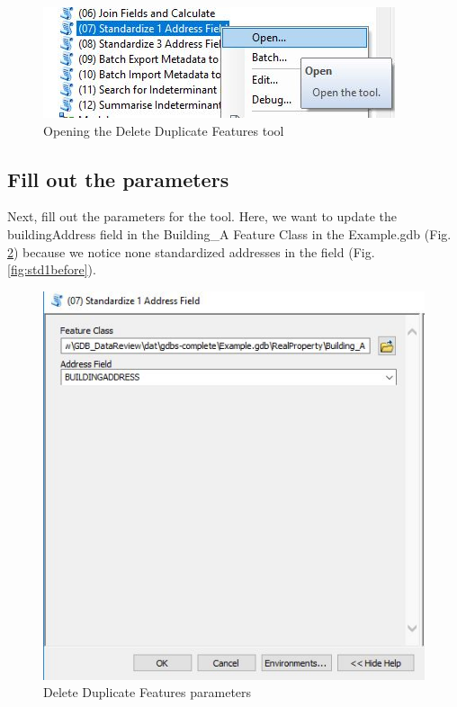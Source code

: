 \documentclass[openany]{book}
\theoremstyle{definition}
\theoremstyle{definition}
\theoremstyle{definition}
\theoremstyle{remark}
\begin{document}
\begin{figure}[H]

{\centering \includegraphics{figures/std1-opentool} 

}

\caption{Opening the Delete Duplicate Features tool}\label{fig:std1open}
\end{figure}

\subsection{Fill out the parameters}\label{fill-out-the-parameters-6}

Next, fill out the parameters for the tool. Here, we want to update the
buildingAddress field in the Building\_A Feature Class in the
Example.gdb (Fig. \ref{fig:std1params}) because we notice none
standardized addresses in the field (Fig. \ref{fig:std1before}).

\begin{figure}[H]

{\centering \includegraphics{figures/std1-toolparams} 

}

\caption{Delete Duplicate Features parameters}\label{fig:std1params}
\end{figure}
\end{document}
